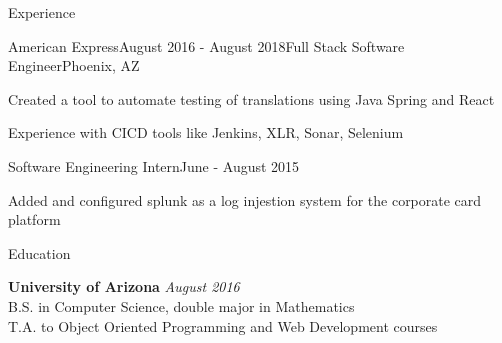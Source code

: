 \documentclass{resume} %
\begin{document}
\begin{rSection}{Experience}
\begin{rSubsection}{American Express}{August 2016 - August 2018}{Full Stack Software Engineer}{Phoenix, AZ}
\item Created a tool to automate testing of translations using Java Spring and React
\item Experience with CICD tools like Jenkins, XLR, Sonar, Selenium
\end{rSubsection}

\begin{rSubsection}{}{}{Software Engineering Intern}{June - August 2015}
\item Added and configured splunk as a log injestion system for the corporate card platform

\end{rSubsection}

\end{rSection}

\begin{rSection}{Education}
	
	{\bf University of Arizona} \hfill {\em August 2016} \\ 
	B.S. in Computer Science, double major in Mathematics  \smallskip \\
	\smallskip T.A. to Object Oriented Programming and Web Development courses
\end{rSection}
\end{document}
